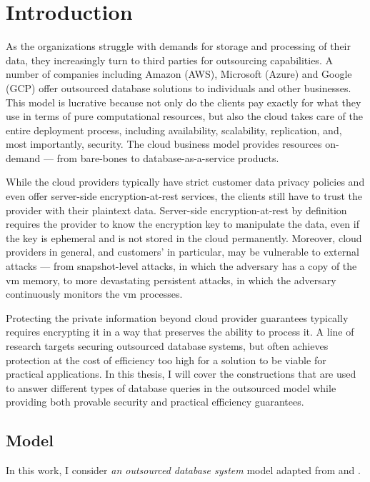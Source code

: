\chapter{Introduction}
\thispagestyle{myheadings}

	As the organizations struggle with demands for storage and processing of their data, they increasingly turn to third parties for outsourcing capabilities.
	A number of companies including Amazon (AWS), Microsoft (Azure) and Google (GCP) offer outsourced database solutions to individuals and other businesses.
	This model is lucrative because not only do the clients pay exactly for what they use in terms of pure computational resources, but also the cloud takes care of the entire deployment process, including availability, scalability, replication, and, most importantly, security.
	The cloud business model provides resources on-demand --- from bare-bones  to database-as-a-service products.

	While the cloud providers typically have strict customer data privacy policies and even offer server-side encryption-at-rest services, the clients still have to trust the provider with their plaintext data.
	Server-side encryption-at-rest by definition requires the provider to know the encryption key to manipulate the data, even if the key is ephemeral and is not stored in the cloud permanently.
	Moreover, cloud providers in general, and customers'  in particular, may be vulnerable to external attacks --- from snapshot-level attacks, in which the adversary has a copy of the \acrshort{vm} memory, to more devastating persistent attacks, in which the adversary continuously monitors the \acrshort{vm} processes.

	Protecting the private information beyond cloud provider guarantees typically requires encrypting it in a way that preserves the ability to process it.
	A line of research targets securing outsourced database systems, but often achieves protection at the cost of efficiency too high for a solution to be viable for practical applications.
	In this thesis, I will cover the constructions that are used to answer different types of database queries in the outsourced model while providing both provable security and practical efficiency guarantees.

	\section{Model}

		In this work, I consider \emph{an outsourced database system} model adapted from \cite{generic-attacks-kellaris} and \cite{epsolute}.

